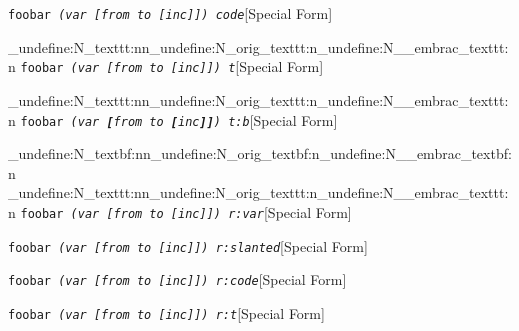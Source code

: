 \documentclass{book}
\begin{document}
%
\noindent\texttt{foobar \EmbracOn{}\textnormal{\textsl{(var \texttt{[}from to \texttt{[}inc\texttt{]]}) code}}\EmbracOff{}}\hfill[Special Form]


\ExplSyntaxOn%
\cs_undefine:N{\embrac_texttt:nn}\cs_undefine:N{\embrac_orig_texttt:n}\cs_undefine:N{\__embrac_texttt:n}%
\ExplSyntaxOff%
%
\noindent\texttt{foobar \EmbracOn{}\textnormal{\textsl{(var \texttt{[}from to \texttt{[}inc\texttt{]]}) t}}\EmbracOff{}}\hfill[Special Form]


\ExplSyntaxOn%
\cs_undefine:N{\embrac_texttt:nn}\cs_undefine:N{\embrac_orig_texttt:n}\cs_undefine:N{\__embrac_texttt:n}%
\ExplSyntaxOff%
%
\noindent\texttt{foobar \EmbracOn{}\textnormal{\textsl{(var \texttt{\textbf{[}}from to \texttt{\textbf{[}}inc\texttt{\textbf{]]}}) t:b}}\EmbracOff{}}\hfill[Special Form]


\ExplSyntaxOn%
\cs_undefine:N{\embrac_textbf:nn}\cs_undefine:N{\embrac_orig_textbf:n}\cs_undefine:N{\__embrac_textbf:n}%
\cs_undefine:N{\embrac_texttt:nn}\cs_undefine:N{\embrac_orig_texttt:n}\cs_undefine:N{\__embrac_texttt:n}%
\ExplSyntaxOff%
%
\noindent\texttt{foobar \EmbracOn{}\textnormal{\textsl{(var \EmbracOff{}\textnormal{\textsl{[}}\EmbracOn{}from to \EmbracOff{}\textnormal{\textsl{[}}\EmbracOn{}inc\EmbracOff{}\textnormal{\textsl{]]}}\EmbracOn{}) r:var}}\EmbracOff{}}\hfill[Special Form]



%
\noindent\texttt{foobar \EmbracOn{}\textnormal{\textsl{(var \EmbracOff{}\textnormal{\textsl{[}}\EmbracOn{}from to \EmbracOff{}\textnormal{\textsl{[}}\EmbracOn{}inc\EmbracOff{}\textnormal{\textsl{]]}}\EmbracOn{}) r:slanted}}\EmbracOff{}}\hfill[Special Form]



%
\noindent\texttt{foobar \EmbracOn{}\textnormal{\textsl{(var \EmbracOff{}\textnormal{\texttt{[}}\EmbracOn{}from to \EmbracOff{}\textnormal{\texttt{[}}\EmbracOn{}inc\EmbracOff{}\textnormal{\texttt{]]}}\EmbracOn{}) r:code}}\EmbracOff{}}\hfill[Special Form]



%
\noindent\texttt{foobar \EmbracOn{}\textnormal{\textsl{(var \EmbracOff{}\textnormal{\texttt{[}}\EmbracOn{}from to \EmbracOff{}\textnormal{\texttt{[}}\EmbracOn{}inc\EmbracOff{}\textnormal{\texttt{]]}}\EmbracOn{}) r:t}}\EmbracOff{}}\hfill[Special Form]
\end{document}
